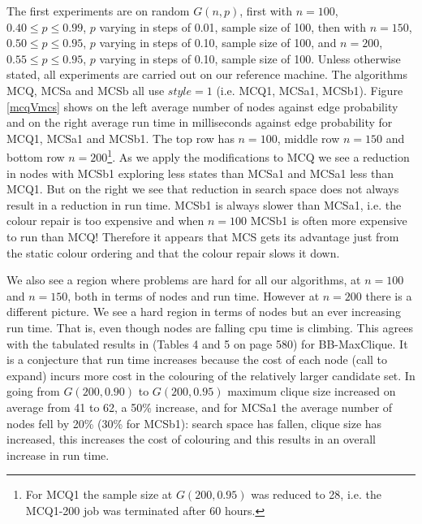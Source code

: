 \documentclass{l4proj}
\begin{document}
The first experiments are on random $G(n,p)$, 
first with $n = 100$, $0.40 \leq p \leq 0.99$, $p$ varying in steps of 0.01, sample size of 100,
then with $n = 150$, $0.50 \leq p \leq 0.95$, $p$ varying in steps of 0.10, sample size of 100, and
$n = 200$, $0.55 \leq p \leq 0.95$, $p$ varying in steps of 0.10, sample size of 100.
Unless otherwise stated, all experiments are carried out on our reference machine. The algorithms MCQ, MCSa and MCSb all use
$style = 1$ (i.e. MCQ1, MCSa1, MCSb1). Figure \ref{mcqVmcs} shows on the left average number of nodes against edge probability and on the right
average run time in milliseconds against edge probability for MCQ1, MCSa1 and MCSb1. 
The top row has $n = 100$, middle row $n = 150$ and bottom row $n = 200$\footnote{For MCQ1 the sample size at $G(200,0.95)$
was reduced to 28, i.e. the MCQ1-200 job was terminated after 60 hours.}.
As we apply the modifications to MCQ we
see a reduction in nodes with MCSb1 exploring less states than MCSa1 and MCSa1 less than MCQ1. 
But on the right we see that reduction in search space
does not always result in a reduction in run time. MCSb1 is always slower than MCSa1, i.e. the colour repair is too expensive
and when $n = 100$ MCSb1 is often more expensive to run than MCQ! Therefore it appears that MCS gets its advantage just
from the static colour ordering and that the colour repair slows it down.

We also see a region where problems are hard for all our algorithms, at $n = 100$ and $n = 150$, both in terms of nodes and run time. 
However at $n = 200$ there is a different picture. We see a hard region in terms of nodes but an ever increasing run time. That
is, even though nodes are falling cpu time is climbing. This agrees with the tabulated results in \cite{segundo2011} (Tables 4
and 5 on page 580) for BB-MaxClique. It is a conjecture that run time increases because the cost of each node (call to
expand) incurs more cost in the colouring of the relatively larger candidate set. 
In going from $G(200,0.90)$ to $G(200,0.95)$ maximum clique size increased on average from 41 to 62, a 50\% increase,
and for MCSa1 the average number of nodes fell by 20\% (30\% for MCSb1): search space has fallen, clique size has increased, this 
increases the cost of colouring and this results in an overall increase in run time.
\end{document}
